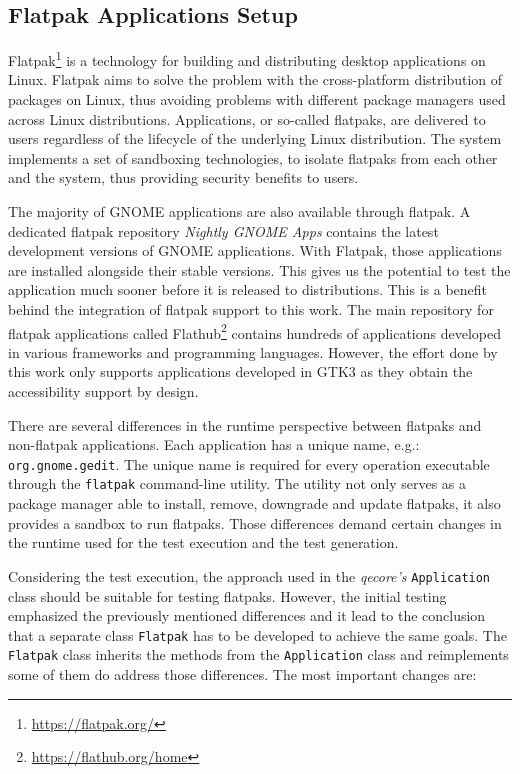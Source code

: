\subsection{Flatpak Applications Setup}
Flatpak\footnote{\url{https://flatpak.org/}} is a technology for building and distributing desktop applications on Linux. Flatpak aims to solve the problem with the cross-platform distribution of packages on Linux, thus avoiding problems with different package managers used across Linux distributions. Applications, or so-called flatpaks, are delivered to users regardless of the lifecycle of the underlying Linux distribution. The system implements a set of sandboxing technologies, to isolate flatpaks from each other and the system, thus providing security benefits to users.\cite{flatpak}

The majority of GNOME applications are also available through flatpak. A dedicated flatpak repository \textit{Nightly GNOME Apps} contains the latest development versions of GNOME applications. With Flatpak, those applications are installed alongside their stable versions. This gives us the potential to test the application much sooner before it is released to distributions. This is a benefit behind the integration of flatpak support to this work. The main repository for flatpak applications called Flathub\footnote{\url{https://flathub.org/home}} contains hundreds of applications developed in various frameworks and programming languages. However, the effort done by this work only supports applications developed in GTK3 as they obtain the accessibility support by design.

There are several differences in the runtime perspective between flatpaks and non-flatpak applications. Each application has a unique name, e.g.: \texttt{org.gnome.gedit}. The unique name is required for every operation executable through the \texttt{flatpak} command-line utility. The utility not only serves as a package manager able to install, remove, downgrade and update flatpaks, it also provides a sandbox to run flatpaks. Those differences demand certain changes in the runtime used for the test execution and the test generation. 

Considering the test execution, the approach used in the \textit{qecore's} \texttt{Application} class should be suitable for testing flatpaks. However, the initial testing emphasized the previously mentioned differences and it lead to the conclusion that a separate class \texttt{Flatpak} has to be developed to achieve the same goals. The \texttt{Flatpak} class inherits the methods from the \texttt{Application} class and reimplements some of them do address those differences. The most important changes are:

